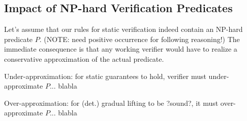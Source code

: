 \subsection{Impact of NP-hard Verification Predicates}
Let's assume that our rules for static verification indeed contain an NP-hard predicate $P$. (NOTE: need positive occurrence for following reasoning!)
The immediate consequence is that any working verifier would have to realize a conservative approximation of the actual predicate.

Under-approximation: for static guarantees to hold, verifier must under-approximate $P$... blabla

Over-approximation: for (det.) gradual lifting to be ?sound?, it must over-approximate $P$... blabla